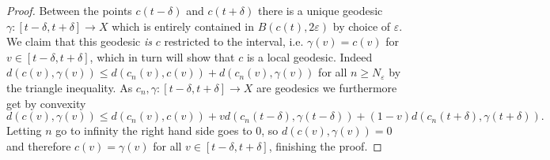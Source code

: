\documentclass[11pt, a4paper, oneside]{memoir}
\theoremstyle{plain}\newtheorem{theorem}[subsection]{Theorem}
\theoremstyle{definition}
\begin{document}
\begin{proof}
Between the points \(c(t-\delta)\) and \(c(t+\delta)\) there is a unique geodesic \(\gamma:[t-\delta,t+\delta]\to X\) which is entirely contained in \(B(c(t),2\varepsilon)\) by choice of \(\varepsilon\).
We claim that this geodesic \textit{is} \(c\) restricted to the interval, i.e. \(\gamma(v)=c(v)\) for \(v\in [t-\delta,t+\delta]\), which in turn will show that \(c\) is a local geodesic.
Indeed \(d(c(v),\gamma(v))\leq d(c_n(v),c(v))+d(c_n(v),\gamma(v))\) for all \(n\geq N_\varepsilon\) by the triangle inequality.
As \(c_n,\gamma:[t-\delta,t+\delta]\to X\) are geodesics we furthermore get by convexity
\[d(c(v),\gamma(v))\leq d(c_n(v),c(v))+vd(c_n(t-\delta),\gamma(t-\delta))+(1-v)d(c_n(t+\delta),\gamma(t+\delta)).\]
Letting \(n\) go to infinity the right hand side goes to 0, so \(d(c(v),\gamma(v))=0\) and therefore \(c(v)=\gamma(v)\) for all \(v\in [t-\delta,t+\delta]\), finishing the proof.
\end{proof}
\end{document}
